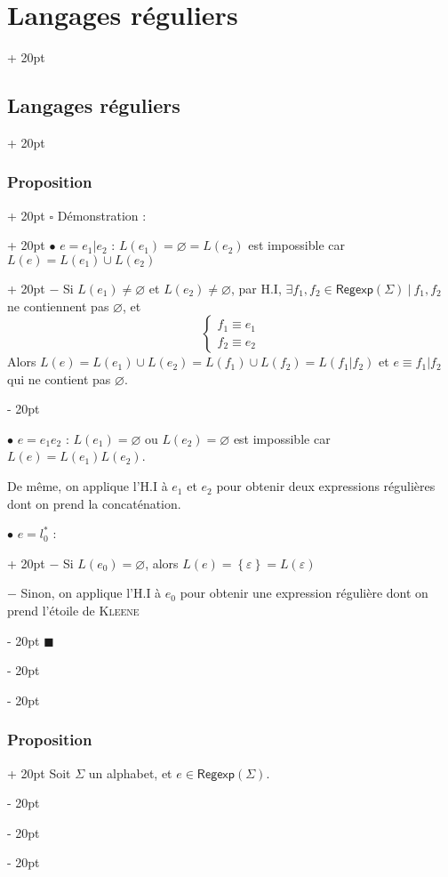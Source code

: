 \documentclass[a4paper, 12pt, twoside]{article}
\newcommand{\set}[1]{\left\{ #1 \right\}}
\newcommand{\ind}[1][20pt]{\advance\leftskip + #1}
\newcommand{\deind}[1][20pt]{\advance\leftskip - #1}
\newenvironment{indt}[2][20pt]{#2 \par \ind[#1]}{\par \deind} %
\newenvironment{proof}[1][{Démonstration :}]{\begin{indt}{$\square$ #1}}{$\blacksquare$ \end{indt}}
\newcommand{\Regexp}{\mathsf{Regexp}}
\begin{document}
\begin{indt}{\section{Langages réguliers}}
\begin{indt}{\subsection{Langages réguliers}}
\begin{indt}{\subsubsection{Proposition}}
\begin{proof}
\begin{indt}{$\bullet$ $e = e_1 | e_2$ : $L(e_1) = \varnothing = L(e_2)$ est impossible car $L(e) = L(e_1) \cup L(e_2)$}
                        $-$ Si $L(e_1) \neq \varnothing$ et $L(e_2) \neq \varnothing$, par H.I, $\exists f_1, f_2 \in \Regexp(\Sigma)\ |\ f_1, f_2$ ne contiennent pas $\varnothing$, et
                        \[
                            \begin{cases}
                                f_1 \equiv e_1
                                \\
                                f_2 \equiv e_2
                            \end{cases}
                        \]
                        Alors $L(e) = L(e_1) \cup L(e_2) = L(f_1) \cup L(f_2) = L(f_1 | f_2)$
                        et $e \equiv f_1 | f_2$ qui ne contient pas $\varnothing$.
                    \end{indt}

                    \vspace{6pt}
                    
                    $\bullet$ $e = e_1 e_2$ : $L(e_1) = \varnothing$ ou $L(e_2) = \varnothing$ est impossible car $L(e) = L(e_1) L(e_2)$.

                    De même, on applique l'H.I à $e_1$ et $e_2$ pour obtenir deux expressions régulières dont on prend la concaténation.

                    \vspace{6pt}
                    
                    \begin{indt}{$\bullet$ $e = l_0^*$ :}
                        $-$ Si $L(e_0) = \varnothing$, alors $L(e) = \set \varepsilon = L(\varepsilon)$

                        $-$ Sinon, on applique l'H.I à $e_0$ pour obtenir une expression régulière dont on prend l'étoile de \textsc{Kleene}
                    \end{indt}
                \end{proof}
            \end{indt}

            \vspace{12pt}
            
            \begin{indt}{\subsubsection{Proposition}}
                Soit $\Sigma$ un alphabet, et $e \in \Regexp(\Sigma)$.


\end{indt}
\end{indt}
\end{indt}
\end{document}
